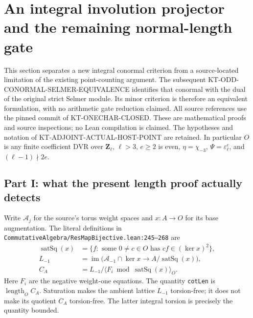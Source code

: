 \section{An integral involution projector and the remaining normal-length gate}
\label{sec:kt-projector}

This section separates a new integral conormal criterion from a
source-located limitation of the existing point-counting argument.
The subsequent KT-ODD-CONORMAL-SELMER-EQUIVALENCE identifies
that conormal with the dual of the original strict Selmer
module.  Its minor criterion is therefore an equivalent
formulation, with no arithmetic gate reduction claimed.
All source references use the pinned commit of KT-ONECHAR-CLOSED.
These are mathematical proofs and source inspections; no Lean
compilation is claimed.  The hypotheses and notation of
KT-ADJOINT-ACTUAL-HOST-POINT are retained.  In particular $O$ is
any finite coefficient DVR over $\mathbf Z_\ell$, $\ell>3$,
$e\geq2$ is even, $\eta=\chi_{-3}$, $\Psi=\varepsilon_\ell^e$,
and $(\ell-1)\nmid2e$.

\subsection{Part I: what the present length proof actually detects}

Write $\mathcal A_j$ for the source's torus weight spaces and
$x:A\to O$ for its base augmentation.  The literal definitions in
\texttt{CommutativeAlgebra/ResMapBijective.lean:245--268} are
\[
 \begin{split}
 \operatorname{satSq}(x)
   &=\{f:\text{ some }0\ne c\in O\text{ has }cf\in(\ker x)^2\},\\
 L_{-1}&=\operatorname{im}\bigl(\mathcal A_{-1}\cap\ker x
                     \longrightarrow A/\operatorname{satSq}(x)\bigr),\\
 C_A&=L_{-1}/\langle F_i\bmod\operatorname{satSq}(x)\rangle_O.
 \end{split}                                                    \tag{KP.1}
\]
Here $F_i$ are the negative weight-one equations.  The quantity
\texttt{cotLen} is $\operatorname{length}_O C_A$.  Saturation
makes the ambient lattice $L_{-1}$ torsion-free; it does not make
its quotient $C_A$ torsion-free.  The latter integral torsion is
precisely the quantity bounded.

